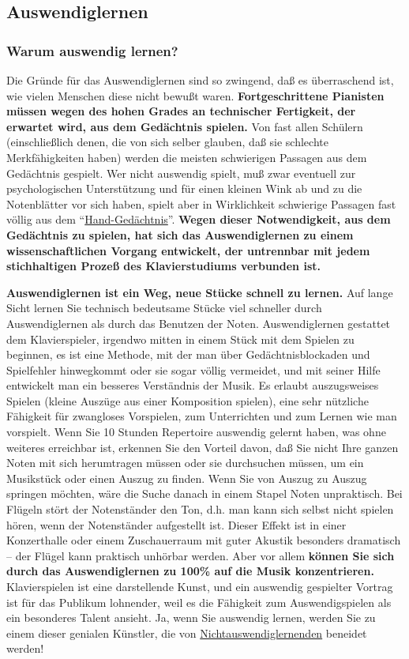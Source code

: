
\subsection{Auswendiglernen}
\label{c1iii6} 

\subsubsection{Warum auswendig lernen?}
\label{c1iii6a}

Die Gründe für das Auswendiglernen sind so zwingend, daß es überraschend ist, wie vielen Menschen diese nicht bewußt waren.
\textbf{Fortgeschrittene Pianisten müssen wegen des hohen Grades an technischer Fertigkeit, der erwartet wird, aus dem Gedächtnis spielen.}
Von fast allen Schülern (einschließlich denen, die von sich selber glauben, daß sie schlechte Merkfähigkeiten haben) werden die meisten schwierigen Passagen aus dem Gedächtnis gespielt.
Wer nicht auswendig spielt, muß zwar eventuell zur psychologischen Unterstützung und für einen kleinen Wink ab und zu die Notenblätter vor sich haben, spielt aber in Wirklichkeit schwierige Passagen fast völlig aus dem \enquote{\hyperref[c1iii6d]{Hand-Gedächtnis}}.
\textbf{Wegen dieser Notwendigkeit, aus dem Gedächtnis zu spielen, hat sich das Auswendiglernen zu einem wissenschaftlichen Vorgang entwickelt, der untrennbar mit jedem stichhaltigen Prozeß des Klavierstudiums verbunden ist.}

\textbf{Auswendiglernen ist ein Weg, neue Stücke schnell zu lernen.}
Auf lange Sicht lernen Sie technisch bedeutsame Stücke viel schneller durch Auswendiglernen als durch das Benutzen der Noten.
Auswendiglernen gestattet dem Klavierspieler, irgendwo mitten in einem Stück mit dem Spielen zu beginnen, es ist eine Methode, mit der man über Gedächtnisblockaden und Spielfehler hinwegkommt oder sie sogar völlig vermeidet, und  mit seiner Hilfe entwickelt man ein besseres Verständnis der Musik.
Es erlaubt auszugsweises Spielen (kleine Auszüge aus einer Komposition spielen), eine sehr nützliche Fähigkeit für zwangloses Vorspielen, zum Unterrichten und zum Lernen wie man vorspielt.
Wenn Sie 10 Stunden Repertoire auswendig gelernt haben, was ohne weiteres erreichbar ist, erkennen Sie den Vorteil davon, daß Sie nicht Ihre ganzen Noten mit sich herumtragen müssen oder sie durchsuchen müssen, um ein Musikstück oder einen Auszug zu finden.
Wenn Sie von Auszug zu Auszug springen möchten, wäre die Suche danach in einem Stapel Noten unpraktisch.
Bei Flügeln stört der Notenständer den Ton, d.h. man kann sich selbst nicht spielen hören, wenn der Notenständer aufgestellt ist.
Dieser Effekt ist in einer Konzerthalle oder einem Zuschauerraum mit guter Akustik besonders dramatisch -- der Flügel kann praktisch unhörbar werden.
Aber vor allem \textbf{können Sie sich durch das Auswendiglernen zu 100\% auf die Musik konzentrieren.}
Klavierspielen ist eine darstellende Kunst, und ein auswendig gespielter Vortrag ist für das Publikum lohnender, weil es die Fähigkeit zum Auswendigspielen als ein besonderes Talent ansieht.
Ja, wenn Sie auswendig lernen, werden Sie zu einem dieser genialen Künstler, die von \hyperref[memorizer]{Nichtauswendiglernenden} beneidet werden!

